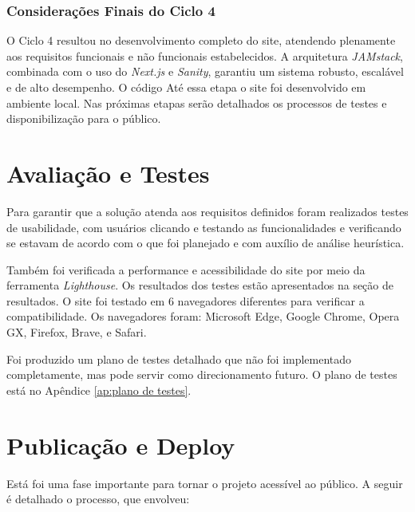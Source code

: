 \subsubsection*{Considerações Finais do Ciclo 4}
O Ciclo 4 resultou no desenvolvimento completo do site, atendendo plenamente aos requisitos funcionais e não funcionais estabelecidos. A arquitetura \textit{JAMstack}, combinada com o uso do \textit{Next.js} e \textit{Sanity}, garantiu um sistema robusto, escalável e de alto desempenho. O código Até essa etapa o site foi desenvolvido em ambiente local. Nas próximas etapas serão detalhados os processos de testes e disponibilização para o público.





\section{Avaliação e Testes}
\label{sec:avaliacao_testes}

Para garantir que a solução atenda aos requisitos definidos foram realizados testes de usabilidade, com usuários clicando e testando as funcionalidades e verificando se estavam de acordo com o que foi planejado e com auxílio de análise heurística.

Também foi verificada a performance e acessibilidade do site por meio da ferramenta \textit{Lighthouse}. Os resultados dos testes estão apresentados na seção de resultados.
O site foi testado em 6 navegadores diferentes para verificar a compatibilidade. Os navegadores foram: Microsoft Edge, Google Chrome, Opera GX, Firefox, Brave, e Safari.

Foi produzido um plano de testes detalhado que não foi implementado completamente, mas pode servir como direcionamento futuro. O plano de testes está no Apêndice \ref{ap:plano de testes}.

\section{Publicação e Deploy}
\label{sec:publicacao_deploy}

Está foi uma fase importante para tornar o projeto acessível ao público. A seguir é detalhado o processo, que envolveu:

